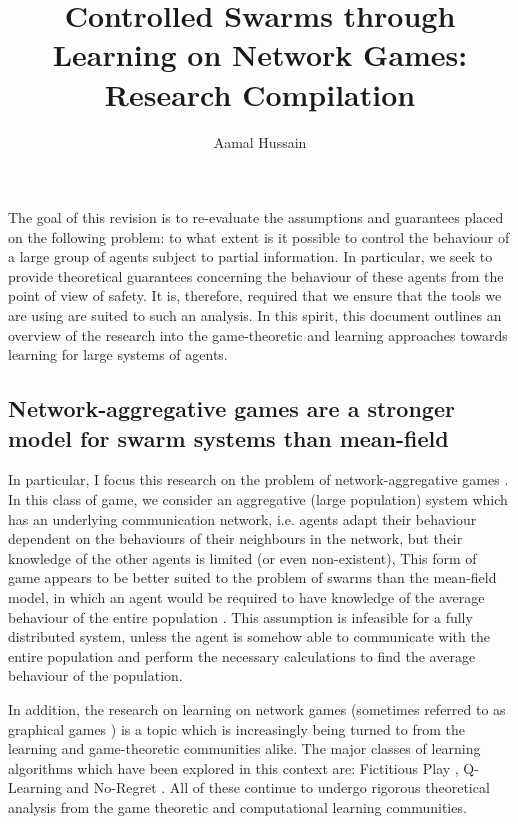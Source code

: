 \documentclass{article}
\title{Controlled Swarms through Learning on Network Games: Research Compilation}
\author{Aamal Hussain}
\date{}
\begin{document}
    \maketitle

The goal of this revision is to re-evaluate the assumptions and guarantees placed on the
following problem: to what extent is it possible to control the behaviour of a large group of agents
subject to partial information. In particular, we seek to provide theoretical guarantees concerning
the behaviour of these agents from the point of view of safety. It is, therefore, required that we
ensure that the tools we are using are suited to such an analysis. In this spirit, this document
outlines an overview of the research into the game-theoretic and learning approaches towards
learning for large systems of agents. 


\subsection*{Network-aggregative games are a stronger model for swarm systems than mean-field}

In particular, I focus this research on the problem of network-aggregative games \cite{Parise}. In this
class of game, we consider an aggregative (large population) system which has an underlying
communication network, i.e. agents adapt their behaviour dependent on the behaviours of their
neighbours in the network, but their knowledge of the other agents is limited (or even
non-existent), This form of game appears to be better suited to the problem of swarms than the
mean-field model, in which an agent would be required to have knowledge of the average behaviour of
the entire population \cite{Paccagnan2019}. This assumption is infeasible for a fully distributed
system, unless the agent is somehow able to communicate with the entire population and perform the
necessary calculations to find the average behaviour of the population.


In addition, the research on learning on network games (sometimes referred to as graphical games
\cite{Li2017}) is a topic which is increasingly being turned to from the
learning and game-theoretic communities alike. The major classes of learning algorithms which have
been explored in this context are: Fictitious Play \cite{Ewerhart2019}, Q-Learning 
\cite{Vamvoudakis2017} and No-Regret \cite{Nagarajan2018}. All
of these continue to undergo rigorous theoretical analysis from the game theoretic and computational
learning communities. 
\end{document}

